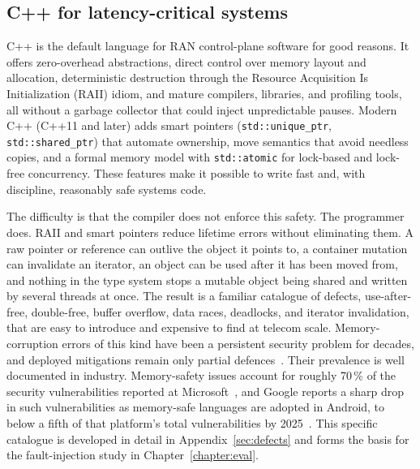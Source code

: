 \documentclass[english,oneside,a4paper,censored,csm,software-track-2020]{HYthesisML}
\begin{document}
\begin{appendices}
\section{C++ for latency-critical systems}\label{sec:cpplatency}
C++ is the default language for RAN control-plane software for good reasons. It offers
zero-overhead abstractions, direct control over memory layout and allocation, deterministic
destruction through the Resource Acquisition Is Initialization (RAII) idiom, and mature
compilers, libraries, and profiling tools, all without a garbage collector that could inject
unpredictable pauses. Modern C++ (C++11 and later) adds smart pointers
(\texttt{std::unique\_ptr}, \texttt{std::shared\_ptr}) that automate ownership, move semantics
that avoid needless copies, and a formal memory model with \texttt{std::atomic} for
lock-based and lock-free concurrency. These features make it possible to write fast and, with
discipline, reasonably safe systems code.

The difficulty is that the compiler does not enforce this safety. The programmer does. RAII and
smart pointers reduce lifetime errors without eliminating them. A raw pointer or reference can
outlive the object it points to, a container mutation can invalidate an iterator, an object can
be used after it has been moved from, and nothing in the type system stops a mutable object
being shared and written by several threads at once. The result is a familiar catalogue of
defects, use-after-free, double-free, buffer overflow, data races, deadlocks, and iterator
invalidation, that are easy to introduce and expensive to find at telecom scale. Memory-corruption errors of this kind have
been a persistent security problem for decades, and deployed mitigations remain only partial
defences~\cite{szekeres2013sok}. Their prevalence is well documented in
industry. Memory-safety issues account for roughly 70\,\% of the security vulnerabilities
reported at Microsoft~\cite{msrc2019memory}, and Google reports a sharp drop in such
vulnerabilities as memory-safe languages are adopted in Android, to below a fifth of that
platform's total vulnerabilities by
2025~\cite{google2022android,vanderstoep2025android}. This
specific catalogue is developed in detail in Appendix~\ref{sec:defects} and forms the basis
for the fault-injection study in Chapter~\ref{chapter:eval}.


\end{appendices}
\end{document}
